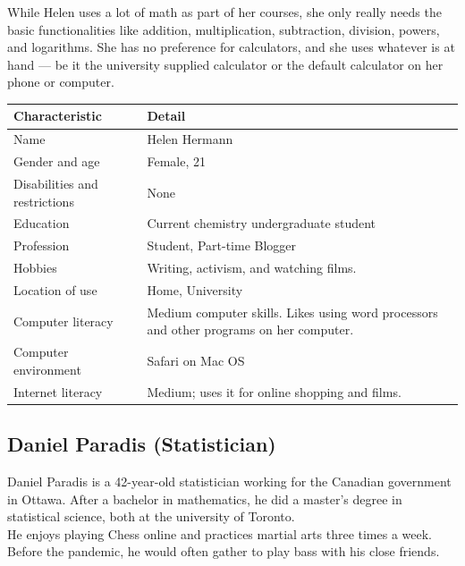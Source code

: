 \documentclass[11pt,onside]{report}
\begin{document}
While Helen uses a lot of math as part of her courses, she only really needs the basic functionalities like addition, multiplication, subtraction, division, powers, and logarithms. She has no preference for calculators, and she uses whatever is at hand — be it the university supplied calculator or the default calculator on her phone or computer.
\begin{center}
    \begin{tabular}{|p{4cm}|p{10cm}|}
        \hline
        \bf{Characteristic} & \bf{Detail} \\
        \hline
        Name &  Helen Hermann \\
        \hline
        Gender and age & Female, 21 \\
        \hline
        Disabilities and restrictions & None \\
        \hline
        Education & Current chemistry undergraduate student \\
        \hline
        Profession & Student, Part-time Blogger \\
        \hline
        Hobbies & Writing, activism, and watching films. \\
        \hline
        Location of use & Home, University \\
        \hline
        Computer literacy & Medium computer skills. Likes using word processors and other programs on her computer. \\
        \hline
        Computer environment &  Safari on Mac OS \\
        \hline
        Internet literacy &  Medium; uses it for online shopping and films. \\
        \hline
    \end{tabular}
\end{center}

\subsection{Daniel Paradis (Statistician)}
Daniel Paradis is a 42-year-old statistician working for the Canadian government in Ottawa. After a bachelor in mathematics, he did a master’s degree in statistical science, both at the university of Toronto. \\

He enjoys playing Chess online and practices martial arts three times a week. Before the pandemic, he would often gather to play bass with his close friends.  \\
\end{document}
